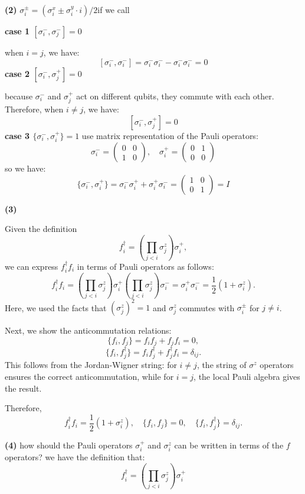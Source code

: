 \documentclass[12pt]{article}
\begin{document}
\textbf{(2)}
$\sigma_i^{\pm}=(\sigma_i^x\pm\sigma_i^y\cdot i)/2$if we call

\textbf{case 1 $[\sigma_i^-,\sigma_j^-]=0$}

when $i=j$, we have:
\[
[\sigma_i^-,\sigma_i^-]=\sigma_i^-\sigma_i^--\sigma_i^-\sigma_i^-=0 
\]
\textbf{case 2 $[\sigma_i^-,\sigma_j^+]=0$}

because $\sigma_i^-$ and $\sigma_j^+$ act on different qubits, they commute with each other. Therefore, when $i \neq j$, we have:
\[[\sigma_i^-,\sigma_j^+]=0\]
\textbf{case 3 $\{\sigma_i^-,\sigma_i^+\}=1$}
use matrix representation of the Pauli operators:
\[\sigma_i^-=\begin{pmatrix}
0 & 0 \\
1 & 0
\end{pmatrix}, \quad \sigma_i^+=\begin{pmatrix} 
0 & 1 \\
0 & 0
\end{pmatrix}\]
so we have:
\[\{\sigma_i^-,\sigma_i^+\}=\sigma_i^-\sigma_i^++\sigma_i^+\sigma_i^-=\begin{pmatrix}
1 & 0 \\
0 & 1
\end{pmatrix}=I\]


\textbf{(3)}

Given the definition
\[
f_i^\dagger = \left( \prod_{j<i} \sigma_j^z \right) \sigma_i^+,
\]
we can express $f_i^\dagger f_i$ in terms of Pauli operators as follows:
\[
f_i^\dagger f_i = \left( \prod_{j<i} \sigma_j^z \right) \sigma_i^+ \left( \prod_{j<i} \sigma_j^z \right) \sigma_i^- = \sigma_i^+ \sigma_i^- = \frac{1}{2}(1 + \sigma_i^z).
\]
Here, we used the facts that $(\sigma_j^z)^2 = 1$ and $\sigma_j^z$ commutes with $\sigma_i^\pm$ for $j \neq i$.

Next, we show the anticommutation relations:
\[
\{f_i, f_j\} = f_i f_j + f_j f_i = 0,
\]
\[
\{f_i, f_j^\dagger\} = f_i f_j^\dagger + f_j^\dagger f_i = \delta_{ij}.
\]
This follows from the Jordan-Wigner string: for $i \neq j$, the string of $\sigma^z$ operators ensures the correct anticommutation, while for $i = j$, the local Pauli algebra gives the result.

Therefore,
\[
f_i^\dagger f_i = \frac{1}{2}(1 + \sigma_i^z), \quad \{f_i, f_j\} = 0, \quad \{f_i, f_j^\dagger\} = \delta_{ij}.
\]

\textbf{(4)}
how should the Pauli operators $\sigma_i^+ $ and $\sigma_i^z $ can be written in terms of the  $f$ operators? 
we have the definition that:
\[
f_i^\dagger = \left( \prod_{j<i} \sigma_j^z \right) \sigma_i^+
\]
\end{document}
